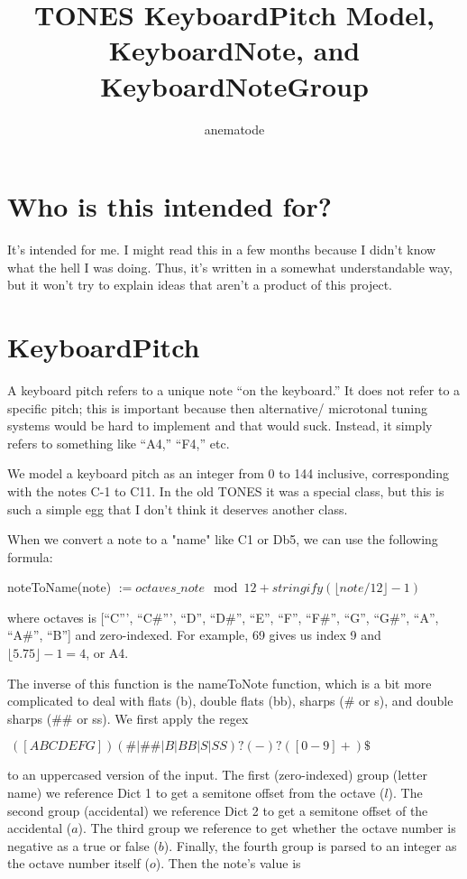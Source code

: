 \documentclass{article}
\begin{document}
\title{TONES KeyboardPitch Model, KeyboardNote, and KeyboardNoteGroup}

\author{anematode}

\maketitle

\section{Who is this intended for?}

It's intended for me. I might read this in a few months because I didn't know what the hell I was doing. Thus, it's written in a somewhat understandable way, but it won't try to explain ideas that aren't a product of this project.

\section{KeyboardPitch}

A keyboard pitch refers to a unique note ``on the keyboard.'' It does not refer to a specific pitch; this is important because then alternative/ microtonal tuning systems would be hard to implement and that would suck. Instead, it simply refers to something like ``A4,'' ``F4,'' etc.

We model a keyboard pitch as an integer from 0 to 144 inclusive, corresponding with the notes C-1 to C11. In the old TONES it was a special class, but this is such a simple egg that I don't think it deserves another class.

When we convert a note to a "name" like C1 or Db5, we can use the following formula:

noteToName(note) $:=octaves\_{note\mod 12} + stringify(\lfloor note / 12\rfloor - 1)$

where octaves is [``C''', ``C\#''', ``D'', ``D\#'', ``E'', ``F'', ``F\#'', ``G'', ``G\#'', ``A'', ``A\#'', ``B''] and zero-indexed. For example, 69 gives us index 9 and $\lfloor 5.75 \rfloor - 1 = 4$, or A4.

The inverse of this function is the nameToNote function, which is a bit more complicated to deal with flats (b), double flats (bb), sharps (\# or s), and double sharps (\#\# or ss). We first apply the regex

$\widehat{}\:([ABCDEFG])(\#|\#\#|B|BB|S|SS)?(-)?([0-9]+)\$$

to an uppercased version of the input. The first (zero-indexed) group (letter name) we reference Dict 1 to get a semitone offset from the octave ($l$). The second group (accidental) we reference Dict 2 to get a semitone offset of the accidental ($a$). The third group we reference to get whether the octave number is negative as a true or false ($b$). Finally, the fourth group is parsed to an integer as the octave number itself ($o$). Then the note's value is
\end{document}
